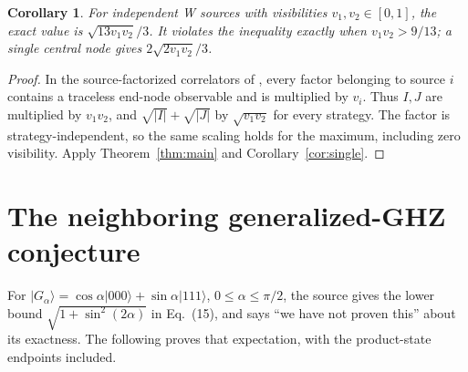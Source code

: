 \documentclass[11pt,a4paper]{article}
\newtheorem{corollary}[theorem]{Corollary}
\begin{document}
\begin{corollary}\label{cor:unequal}
For independent W sources with visibilities $v_1,v_2\in[0,1]$, the exact
value is $\sqrt{13v_1v_2}/3$. It violates the inequality exactly when
$v_1v_2>9/13$; a single central node gives $2\sqrt{2v_1v_2}/3$.
\end{corollary}
\begin{proof}
In the source-factorized correlators of \cite[Eq.~(B3)]{CK}, every
factor belonging to source $i$ contains a traceless end-node observable
and is multiplied by $v_i$. Thus $I,J$ are multiplied by $v_1v_2$,
and $\sqrt{|I|}+\sqrt{|J|}$ by $\sqrt{v_1v_2}$ for every strategy.
The factor is strategy-independent, so the same scaling holds for the
maximum, including zero visibility. Apply Theorem~\ref{thm:main}
and Corollary~\ref{cor:single}.
\end{proof}

\section{The neighboring generalized-GHZ conjecture}
For $|G_\alpha\rangle=\cos\alpha|000\rangle+\sin\alpha|111\rangle$,
$0\leq\alpha\leq\pi/2$, the source gives the lower bound
$\sqrt{1+\sin^2(2\alpha)}$ in Eq.~(15), and says
``we have not proven this'' about its exactness. The following proves
that expectation, with the product-state endpoints included.
\end{document}
